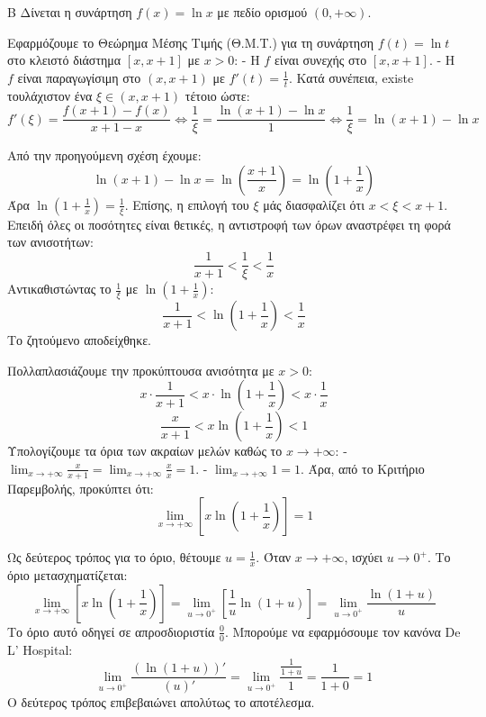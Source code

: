 \begin{thema}{Β}
Δίνεται η συνάρτηση $f(x) = \ln x$ με πεδίο ορισμού $(0, +\infty)$.
\begin{erwthma}
\item Εφαρμόζουμε το Θεώρημα Μέσης Τιμής (Θ.Μ.Τ.) για τη συνάρτηση $f(t) = \ln t$ στο κλειστό διάστημα $[x, x+1]$ με $x > 0$:
- Η $f$ είναι συνεχής στο $[x, x+1]$.
- Η $f$ είναι παραγωγίσιμη στο $(x, x+1)$ με $f'(t) = \frac{1}{t}$.
Κατά συνέπεια, existe τουλάχιστον ένα $\xi \in (x, x+1)$ τέτοιο ώστε:
\[ f'(\xi) = \frac{f(x+1) - f(x)}{x+1 - x} \Leftrightarrow \frac{1}{\xi} = \frac{\ln(x+1) - \ln x}{1} \Leftrightarrow \frac{1}{\xi} = \ln(x+1) - \ln x \]

\item Από την προηγούμενη σχέση έχουμε: 
\[ \ln(x+1) - \ln x = \ln\left( \frac{x+1}{x} \right) = \ln\left( 1 + \frac{1}{x} \right) \]
Άρα $\ln\left( 1 + \frac{1}{x} \right) = \frac{1}{\xi}$.
Επίσης, η επιλογή του $\xi$ μάς διασφαλίζει ότι $x < \xi < x+1$.
Επειδή όλες οι ποσότητες είναι θετικές, η αντιστροφή των όρων αναστρέφει τη φορά των ανισοτήτων:
\[ \frac{1}{x+1} < \frac{1}{\xi} < \frac{1}{x} \]
Αντικαθιστώντας το $\frac{1}{\xi}$ με $\ln\left( 1 + \frac{1}{x} \right)$:
\[ \frac{1}{x+1} < \ln\left( 1 + \frac{1}{x} \right) < \frac{1}{x} \]
Το ζητούμενο αποδείχθηκε.

\item Πολλαπλασιάζουμε την προκύπτουσα ανισότητα με $x > 0$:
\[ x \cdot \frac{1}{x+1} < x \cdot \ln\left( 1 + \frac{1}{x} \right) < x \cdot \frac{1}{x} \]
\[ \frac{x}{x+1} < x \ln\left( 1 + \frac{1}{x} \right) < 1 \]
Υπολογίζουμε τα όρια των ακραίων μελών καθώς το $x \to +\infty$:
- $\lim_{x\to+\infty} \frac{x}{x+1} = \lim_{x\to+\infty} \frac{x}{x} = 1$.
- $\lim_{x\to+\infty} 1 = 1$.
Άρα, από το Κριτήριο Παρεμβολής, προκύπτει ότι:
\[ \lim_{x \to +\infty} \left[ x \ln\left( 1 + \frac{1}{x} \right) \right] = 1 \]

\item Ως δεύτερος τρόπος για το όριο, θέτουμε $u = \frac{1}{x}$. Όταν $x \to +\infty$, ισχύει $u \to 0^+$.
Το όριο μετασχηματίζεται:
\[ \lim_{x\to+\infty} \left[ x \ln\left( 1 + \frac{1}{x} \right) \right] = \lim_{u\to0^+} \left[ \frac{1}{u} \ln(1+u) \right] = \lim_{u\to0^+} \frac{\ln(1+u)}{u} \]
Το όριο αυτό οδηγεί σε απροσδιοριστία $\frac{0}{0}$. Μπορούμε να εφαρμόσουμε τον κανόνα De L' Hospital:
\[ \lim_{u\to0^+} \frac{(\ln(1+u))'}{(u)'} = \lim_{u\to0^+} \frac{\frac{1}{1+u}}{1} = \frac{1}{1+0} = 1 \]
Ο δεύτερος τρόπος επιβεβαιώνει απολύτως το αποτέλεσμα.
\end{erwthma}
\end{thema}

